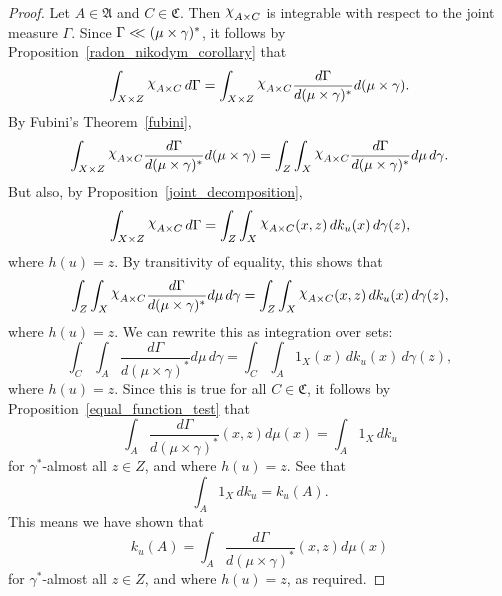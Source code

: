 \documentclass[
twoside=true,
paper=letter,
fontsize=9pt,
pagesize=auto,
leqno,
openany,
headsepline,
overfullrule,
]{scrbook}
\theoremstyle{plain}
\theoremstyle{plain}
\theoremstyle{definition}
\theoremstyle{bfnoteitalic}
\theoremstyle{bfnoteroman}
\newcommand{\sigalg}[1]{\mathfrak{#1}}
\newcommand{\charfunction}[1]{{\raisebox{2pt}{$\chi$}}_{#1}}
\newcommand{\sigmaalgebra}{\sigalg{A}}
\newcommand{\sigmaalgebraiii}{\sigalg{C}}
\newcommand{\funch}{h}
\newcommand{\funck}{k}
\newcommand{\measurespace}{X}
\newcommand{\measurespaceiii}{Z}
\newcommand{\mspaceelt}{x}
\newcommand{\mspaceeltiii}{z}
\newcommand{\abscont}{\mathrel{< \kern-3.5pt <}}
\newcommand{\measure}{\mu}
\newcommand{\measmu}{\mu}
\newcommand{\seti}{A}
\newcommand{\setiii}{C}
\newcommand{\uspaceelt}{u}
\newcommand{\measonprod}{\Gamma}%
\newcommand{\marginalthree}{\gamma}
\begin{document}
\begin{proof}
Let
$\seti\in\sigmaalgebra$
and
$\setiii\in\sigmaalgebraiii$.
Then
$\charfunction{\seti\times\setiii}$
is integrable with respect to the joint measure
$\measonprod$.
Since
$\measonprod \abscont (\measmu\times\marginalthree)^*$,
it follows by Proposition~\ref{radon_nikodym_corollary} that
\[
\int_{\measurespace\times\measurespaceiii}
\charfunction{\seti\times\setiii}
\, d\measonprod
=
\int_{\measurespace\times\measurespaceiii}
\charfunction{\seti\times\setiii}
\frac{d\measonprod}{d(\measure\times\marginalthree)^*}
d(\measmu\times\marginalthree).
\]
By Fubini's Theorem~\ref{fubini},
\[
\int_{\measurespace\times\measurespaceiii}
\charfunction{\seti\times\setiii}
\frac{d\measonprod}{d(\measure\times\marginalthree)^*}
d(\measmu\times\marginalthree)
=
\int_{\measurespaceiii}
\int_{\measurespace}
\charfunction{\seti\times\setiii}
\frac{d\measonprod}{d(\measure\times\marginalthree)^*}
d \measmu
\, d \marginalthree .
\]
But also, by Proposition~\ref{joint_decomposition},
\[
\int_{\measurespace\times\measurespaceiii}
\charfunction{\seti\times\setiii}
\, d \measonprod
=
\int_\measurespaceiii\int_\measurespace
\charfunction{\seti\times\setiii}
(\mspaceelt,\mspaceeltiii)
\, d \funck_\uspaceelt(\mspaceelt)
\, d \marginalthree(\mspaceeltiii),
\]
where  $\funch(\uspaceelt) = \mspaceeltiii$.
By transitivity of equality, this shows that
\[
\int_{\measurespaceiii}
\int_{\measurespace}
\charfunction{\seti\times\setiii}
\frac{d\measonprod}{d(\measure\times\marginalthree)^*}
d \measmu
\, d \marginalthree
=
\int_\measurespaceiii
\int_\measurespace
\charfunction{\seti\times\setiii}
(\mspaceelt,\mspaceeltiii)
\, d \funck_\uspaceelt(\mspaceelt)
\, d \marginalthree(\mspaceeltiii),
\]
where  $\funch(\uspaceelt) = \mspaceeltiii$.
We can rewrite this as integration over sets:
\[
\int_{\setiii}
\int_{\seti}
\frac{d\measonprod}{d(\measure\times\marginalthree)^*}
d \measmu
\, d \marginalthree
=
\int_\setiii
\int_\seti
1_\measurespace
(\mspaceelt)
\, d \funck_\uspaceelt(\mspaceelt)
\, d \marginalthree(\mspaceeltiii),
\]
where  $\funch(\uspaceelt) = \mspaceeltiii$.
Since this is true for all $\setiii\in\sigmaalgebraiii$, it follows by Proposition~\ref{equal_function_test} that
\[
\int_{\seti}
\frac{d\measonprod}{d(\measure\times\marginalthree)^*}
(\mspaceelt,\mspaceeltiii)
d \measmu(\mspaceelt)
=
\int_\seti
1_\measurespace
\, d \funck_\uspaceelt
\]
for $\marginalthree^*$\hyp{}almost all $\mspaceeltiii\in\measurespaceiii$, and where
$\funch(\uspaceelt)=\mspaceeltiii$.
See that
\[
\int_\seti
1_\measurespace
\, d \funck_\uspaceelt
=
\funck_\uspaceelt(\seti).
\]
This means we have shown that
\[
\funck_\uspaceelt(\seti)
=
\int_{\seti}
\frac{d\measonprod}{d(\measure\times\marginalthree)^*}
(\mspaceelt,\mspaceeltiii)
d \measmu(\mspaceelt)
\]
for $\marginalthree^*$\hyp{}almost all $\mspaceeltiii\in\measurespaceiii$, and where
$\funch(\uspaceelt)=\mspaceeltiii$, as required.
\end{proof}
\end{document}
